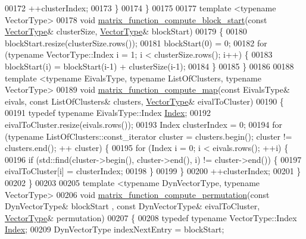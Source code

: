 \begin{DoxyCode}
00172     ++clusterIndex;
00173   \}
00174 \}
00175 
00177 \textcolor{keyword}{template} <\textcolor{keyword}{typename} VectorType>
00178 \textcolor{keywordtype}{void} \hyperlink{namespace_eigen_1_1internal_a2144f635d30028a25e7eb3510c315ad3}{matrix\_function\_compute\_block\_start}(\textcolor{keyword}{const} 
      \hyperlink{struct_vector_type}{VectorType}& clusterSize, \hyperlink{struct_vector_type}{VectorType}& blockStart)
00179 \{
00180   blockStart.resize(clusterSize.rows());
00181   blockStart(0) = 0;
00182   \textcolor{keywordflow}{for} (\textcolor{keyword}{typename} VectorType::Index i = 1; i < clusterSize.rows(); i++) \{
00183     blockStart(i) = blockStart(i-1) + clusterSize(i-1);
00184   \}
00185 \}
00186 
00188 \textcolor{keyword}{template} <\textcolor{keyword}{typename} EivalsType, \textcolor{keyword}{typename} ListOfClusters, \textcolor{keyword}{typename} VectorType>
00189 \textcolor{keywordtype}{void} \hyperlink{namespace_eigen_1_1internal_ade67364a006320cd7103f0f3366def09}{matrix\_function\_compute\_map}(\textcolor{keyword}{const} EivalsType& eivals, \textcolor{keyword}{const} ListOfClusters&
       clusters, \hyperlink{struct_vector_type}{VectorType}& eivalToCluster)
00190 \{
00191   \textcolor{keyword}{typedef} \textcolor{keyword}{typename} EivalsType::Index \hyperlink{namespace_eigen_a62e77e0933482dafde8fe197d9a2cfde}{Index};
00192   eivalToCluster.resize(eivals.rows());
00193   Index clusterIndex = 0;
00194   \textcolor{keywordflow}{for} (\textcolor{keyword}{typename} ListOfClusters::const\_iterator cluster = clusters.begin(); cluster != clusters.end(); ++
      cluster) \{
00195     \textcolor{keywordflow}{for} (Index i = 0; i < eivals.rows(); ++i) \{
00196       \textcolor{keywordflow}{if} (std::find(cluster->begin(), cluster->end(), i) != cluster->end()) \{
00197         eivalToCluster[i] = clusterIndex;
00198       \}
00199     \}
00200     ++clusterIndex;
00201   \}
00202 \}
00203 
00205 \textcolor{keyword}{template} <\textcolor{keyword}{typename} DynVectorType, \textcolor{keyword}{typename} VectorType>
00206 \textcolor{keywordtype}{void} \hyperlink{namespace_eigen_1_1internal_a0434fe5b0ec47e69b8e351ef9e131bcd}{matrix\_function\_compute\_permutation}(\textcolor{keyword}{const} DynVectorType& blockStart
      , \textcolor{keyword}{const} DynVectorType& eivalToCluster, \hyperlink{struct_vector_type}{VectorType}& permutation)
00207 \{
00208   \textcolor{keyword}{typedef} \textcolor{keyword}{typename} VectorType::Index \hyperlink{namespace_eigen_a62e77e0933482dafde8fe197d9a2cfde}{Index};
00209   DynVectorType indexNextEntry = blockStart;

\end{DoxyCode}
